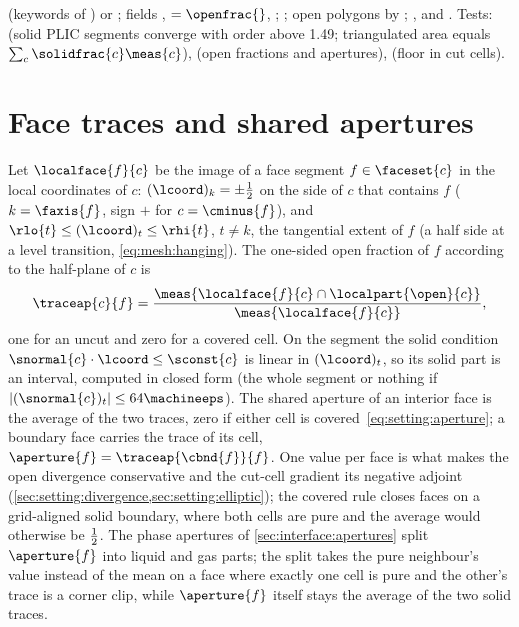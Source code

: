 \begin{implnote}
 (keywords of
) or ; fields
,  $=\openfrac{}$, ;
; open polygons
 by
;
,  and
. Tests:
(solid PLIC segments converge with order above 1.49; triangulated area equals
$\sum_c\solidfrac{c}\meas{c}$),
(open fractions and apertures),
 (floor in cut
cells).
\end{implnote}

\section{Face traces and shared apertures}\label{sec:cutcells:apertures}
Let $\localface{f}{c}$ be the image of a face segment $f\in\faceset{c}$ in the
local coordinates of $c$: $(\lcoord)_k=\pm\half$ on the side of $c$ that
contains $f$ ($k=\faxis{f}$, sign $+$ for $c=\cminus{f}$), and
$\rlo{t}\le(\lcoord)_t\le\rhi{t}$, $t\neq k$, the tangential extent of $f$ (a
half side at a level transition, \cref{eq:mesh:hanging}). The one-sided open
fraction of $f$ according to the half-plane of $c$ is
\begin{equation}\label{eq:cutcells:trace}
  \traceap{c}{f}=\frac{\meas{\localface{f}{c}\cap\localpart{\open}{c}}}{\meas{\localface{f}{c}}},
\end{equation}
one for an uncut and zero for a covered cell. On the segment the solid
condition $\snormal{c}\cdot\lcoord\le\sconst{c}$ is linear in $(\lcoord)_t$, so
its solid part is an interval, computed in closed form (the whole segment or
nothing if $\abs{(\snormal{c})_t}\le64\machineeps$). The shared aperture of
an interior face is the average of the two traces, zero if either cell is
covered~\cref{eq:setting:aperture}; a boundary face carries the trace of its
cell, $\aperture{f}=\traceap{\cbnd{f}}{f}$. One value per face is what makes
the open divergence conservative and the cut-cell gradient its negative
adjoint (\cref{sec:setting:divergence,sec:setting:elliptic}); the covered rule
closes faces on a grid-aligned solid boundary, where both cells are pure and
the average would otherwise be $\frac{1}{2}$. The phase apertures of
\cref{sec:interface:apertures} split $\aperture{f}$ into liquid and gas parts;
the split takes the pure neighbour's value instead of the mean on a face where
exactly one cell is pure and the other's trace is a corner clip, while
$\aperture{f}$ itself stays the average of the two solid traces.

